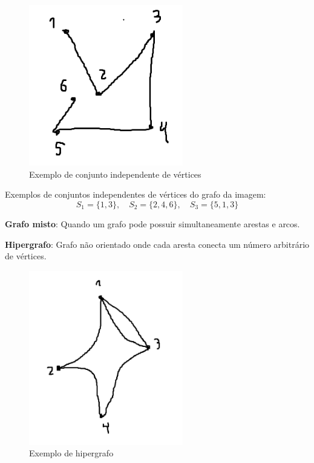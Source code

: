 \begin{figure}[H]
    \centering
    \includegraphics[width=0.6\textwidth]{figuras/Conjuntoidepen.png}
    \caption{Exemplo de conjunto independente de vértices}
\end{figure}

Exemplos de conjuntos independentes de vértices do grafo da imagem:
\[
S_1 = \{1,3\}, \quad
S_2 = \{2,4,6\}, \quad
S_3 = \{5,1,3\}
\]

\medskip

\textbf{Grafo misto}:
Quando um grafo pode possuir simultaneamente arestas e arcos.

\medskip

\textbf{Hipergrafo}:
Grafo não orientado onde cada aresta conecta um número arbitrário de vértices.

\begin{figure}[H]
    \centering
    \includegraphics[width=0.6\textwidth]{figuras/Hipergrafo.png}
    \caption{Exemplo de hipergrafo}
\end{figure}

